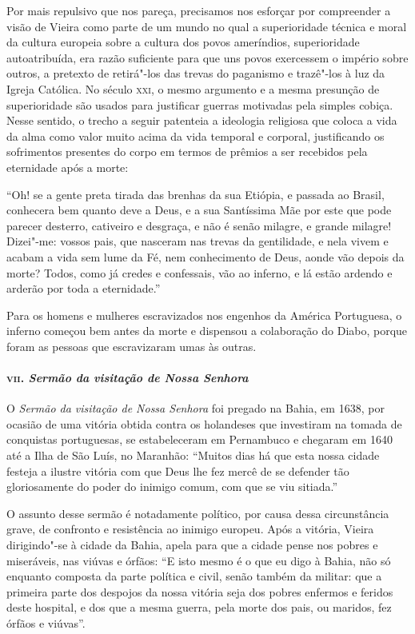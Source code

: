 Por mais repulsivo que nos pareça, precisamos nos esforçar por
compreender a visão de Vieira como parte de um mundo no qual a
superioridade técnica e moral da cultura europeia sobre a cultura dos
povos ameríndios, superioridade autoatribuída, era razão suficiente para
que uns povos exercessem o império sobre outros, a pretexto de
retirá"-los das trevas do paganismo e trazê"-los à luz da Igreja Católica.
No século \textsc{xxi}, o mesmo argumento e a mesma presunção de superioridade
são usados para justificar guerras motivadas pela simples cobiça. Nesse
sentido, o trecho a seguir patenteia a ideologia religiosa que coloca a
vida da alma como valor muito acima da vida temporal e corporal,
justificando os sofrimentos presentes do corpo em termos de prêmios a
ser recebidos pela eternidade após a morte:

``Oh! se a gente preta tirada das brenhas da sua Etiópia, e passada ao
Brasil, conhecera bem quanto deve a Deus, e a sua Santíssima Mãe por
este que pode parecer desterro, cativeiro e desgraça, e não é senão
milagre, e grande milagre! Dizei"-me: vossos pais, que nasceram nas
trevas da gentilidade, e nela vivem e acabam a vida sem lume da Fé, nem
conhecimento de Deus, aonde vão depois da morte? Todos, como já credes e
confessais, vão ao inferno, e lá estão ardendo e arderão por toda a
eternidade.''

Para os homens e mulheres escravizados nos engenhos da América
Portuguesa, o inferno começou bem antes da morte e dispensou a
colaboração do Diabo, porque foram as pessoas que escravizaram umas às
outras.

\paragraph{\textsc{vii}. \emph{Sermão da visitação de Nossa Senhora}}

O \emph{Sermão da visitação de Nossa Senhora} foi pregado na Bahia, em
1638, por ocasião de uma vitória obtida contra os holandeses que
investiram na tomada de conquistas portuguesas, se estabeleceram em
Pernambuco e chegaram em 1640 até a Ilha de São Luís, no Maranhão:
``Muitos dias há que esta nossa cidade festeja a ilustre vitória com que
Deus lhe fez mercê de se defender tão gloriosamente do poder do inimigo
comum, com que se viu sitiada.''

O assunto desse sermão é notadamente político, por causa dessa
circunstância grave, de confronto e resistência ao inimigo europeu. Após
a vitória, Vieira dirigindo"-se à cidade da Bahia, apela para que a
cidade pense nos pobres e miseráveis, nas viúvas e órfãos: ``E isto
mesmo é o que eu digo à Bahia, não só enquanto composta da parte
política e civil, senão também da militar: que a primeira parte dos
despojos da nossa vitória seja dos pobres enfermos e feridos deste
hospital, e dos que a mesma guerra, pela morte dos pais, ou maridos, fez
órfãos e viúvas''.

